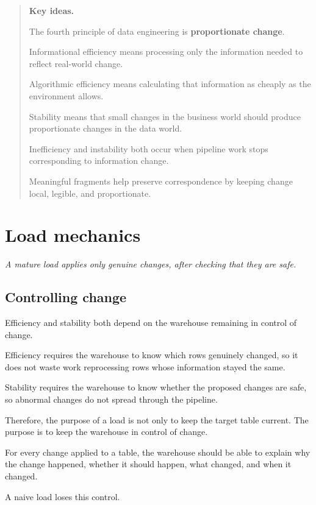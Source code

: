 \documentclass[10pt,openany,10pt]{book}
\begin{document}
\begin{quote}
\textbf{Key ideas.}

The fourth principle of data engineering is \textbf{proportionate
change}.

Informational efficiency means processing only the information needed to
reflect real-world change.

Algorithmic efficiency means calculating that information as cheaply as
the environment allows.

Stability means that small changes in the business world should produce
proportionate changes in the data world.

Inefficiency and instability both occur when pipeline work stops
corresponding to information change.

Meaningful fragments help preserve correspondence by keeping change
local, legible, and proportionate.
\end{quote}

\newpage

\chapter{Load
mechanics}\label{docs-efficient-stable-pipeline-load-mechanics}

\emph{A mature load applies only genuine changes, after checking that
they are safe.}

\section{Controlling change}\label{controlling-change}

Efficiency and stability both depend on the warehouse remaining in
control of change.

Efficiency requires the warehouse to know which rows genuinely changed,
so it does not waste work reprocessing rows whose information stayed the
same.

Stability requires the warehouse to know whether the proposed changes
are safe, so abnormal changes do not spread through the pipeline.

Therefore, the purpose of a load is not only to keep the target table
current. The purpose is to keep the warehouse in control of change.

For every change applied to a table, the warehouse should be able to
explain why the change happened, whether it should happen, what changed,
and when it changed.

A naive load loses this control.
\end{document}
